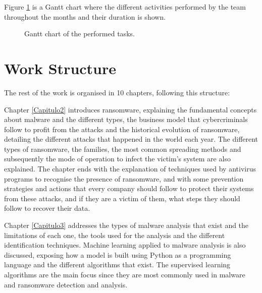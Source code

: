 Figure \ref{fig:gantt} is a Gantt chart where the different activities performed by the team throughout the months and their duration is shown.

\begin{figure}[htb]
\begin{center}
{}
\end{center}
\caption{Gantt chart of the performed tasks.}
\label{fig:gantt}
\end{figure}

\section{Work Structure}
\noindent The rest of the work is organised in 10 chapters, following this structure:

Chapter \ref{Capitulo2} introduces ransomware, explaining the fundamental concepts about malware and the different types, the business model that cybercriminals follow to profit from the attacks and the historical evolution of ransomware, detailing the different attacks that happened in the world each year. The different types of ransomware, the families, the most common spreading methods and subsequently the mode of operation to infect the victim's system are also explained. The chapter ends with the explanation of techniques used by antivirus programs to recognise the presence of ransomware, and with some prevention strategies and actions that every company should follow to protect their systems from these attacks, and if they are a victim of them, what steps they should follow to recover their data.

Chapter \ref{Capitulo3} addresses the types of malware analysis that exist and the limitations of each one, the tools used for the analysis and the different identification techniques. Machine learning applied to malware analysis is also discussed, exposing how a model is built using Python as a programming language and the different algorithms that exist. The supervised learning algorithms are the main focus since they are most commonly used in malware and ransomware detection and analysis.

